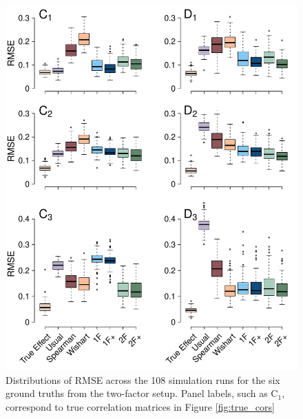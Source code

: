 \documentclass[man, 12pt]{apa7} %
\begin{document}
\begin{figure}[htbp]
    \centering  
    \includegraphics[width=\linewidth, height=1.1\linewidth, keepaspectratio]{_figs/rmse-res2.pdf}
    \caption{Distributions of RMSE across the 108 simulation runs for the six ground truths from the two-factor setup. Panel labels, such as C$_1$, correspond to true correlation matrices in Figure \ref{fig:true_cors}} 
    \label{fig:rmse-res2}
\end{figure}
\end{document}
